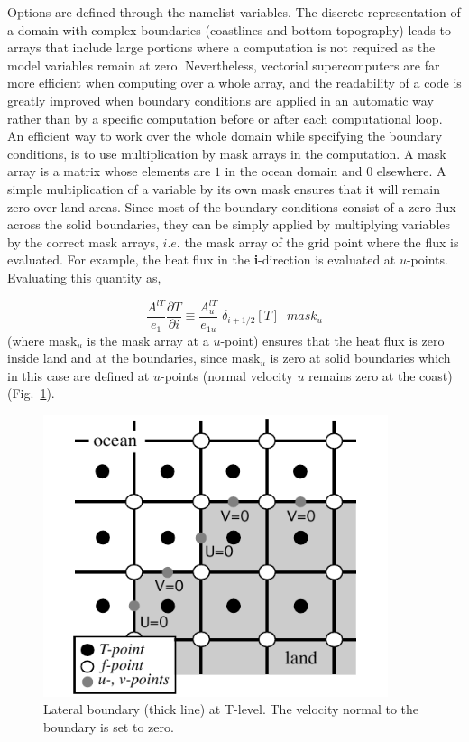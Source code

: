 Options are defined through the  namelist variables.
The discrete representation of a domain with complex boundaries (coastlines and 
bottom topography) leads to arrays that include large portions where a computation 
is not required as the model variables remain at zero. Nevertheless, vectorial 
supercomputers are far more efficient when computing over a whole array, and the 
readability of a code is greatly improved when boundary conditions are applied in 
an automatic way rather than by a specific computation before or after each 
computational loop. An efficient way to work over the whole domain while specifying 
the boundary conditions, is to use multiplication by mask arrays in the computation. 
A mask array is a matrix whose elements are $1$ in the ocean domain and $0$ 
elsewhere. A simple multiplication of a variable by its own mask ensures that it will 
remain zero over land areas. Since most of the boundary conditions consist of a 
zero flux across the solid boundaries, they can be simply applied by multiplying 
variables by the correct mask arrays, $i.e.$ the mask array of the grid point where 
the flux is evaluated. For example, the heat flux in the \textbf{i}-direction is evaluated 
at $u$-points. Evaluating this quantity as,

\begin{equation} \label{Eq_lbc_aaaa}
\frac{A^{lT} }{e_1 }\frac{\partial T}{\partial i}\equiv \frac{A_u^{lT} 
}{e_{1u} } \; \delta _{i+1 / 2} \left[ T \right]\;\;mask_u 
\end{equation}
(where mask$_{u}$ is the mask array at a $u$-point) ensures that the heat flux is 
zero inside land and at the boundaries, since mask$_{u}$ is zero at solid boundaries 
which in this case are defined at $u$-points (normal velocity $u$ remains zero at 
the coast) (Fig.~\ref{Fig_LBC_uv}). 

\begin{figure}[!t]     \begin{center}
\includegraphics[width=0.90\textwidth]{./TexFiles/Figures/Fig_LBC_uv.pdf}
\caption{  \label{Fig_LBC_uv}
Lateral boundary (thick line) at T-level. The velocity normal to the boundary is set to zero.}
\end{center}   \end{figure}

